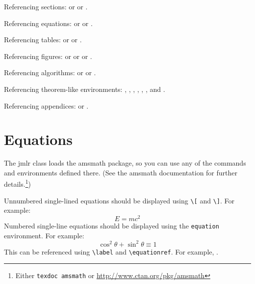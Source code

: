 \documentclass[pmlr]{jmlr}%
\begin{document}
Referencing sections:  or
 or
.

Referencing equations:  or
 or
.

Referencing tables:  or
 or
.

Referencing figures:  or
 or
 or
.

Referencing algorithms:  or
 or
.

Referencing theorem-like environments: ,
, , 
, ,
,  and
.

Referencing appendices:  or
.

\section{Equations}
\label{sec:math}

The \textsf{jmlr} class loads the \textsf{amsmath} package, so
you can use any of the commands and environments defined there.
(See the \textsf{amsmath} documentation for further
details.\footnote{Either \texttt{texdoc amsmath} or
\url{http://www.ctan.org/pkg/amsmath}})

Unnumbered single-lined equations should be displayed using
\verb|\[| and \verb|\]|. For example:
\[E = m c^2\]
Numbered single-line equations should be displayed using the
\texttt{equation} environment. For example:
\begin{equation}\label{eq:trigrule}
\cos^2\theta + \sin^2\theta \equiv 1
\end{equation}
This can be referenced using \verb|\label| and \verb|\equationref|.
For example, .
\end{document}
